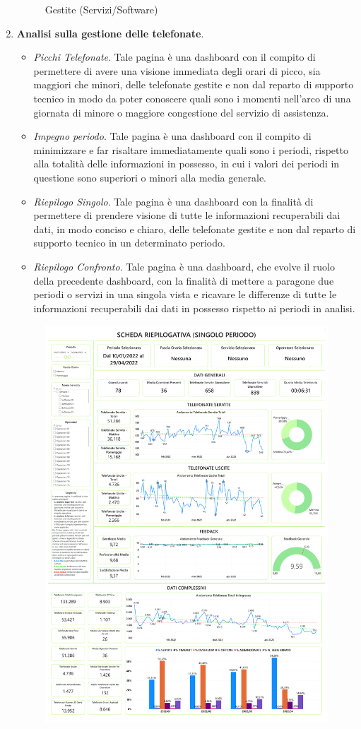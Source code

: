 \begin{enumerate}
\begin{figure}[H]
        \caption{Gestite (Servizi/Software)}
        \label{fig:BI Call Report-3}
        \end{figure}
    \item \textbf{Analisi sulla gestione delle telefonate}.
        \begin{itemize}
        \item \textit{Picchi Telefonate}. Tale pagina è una dashboard con il compito di permettere di avere una visione immediata degli orari di picco, sia maggiori che minori, delle telefonate gestite e non dal reparto di supporto tecnico in modo da poter conoscere quali sono i momenti nell'arco di una giornata di minore o maggiore congestione del servizio di assistenza.
        \item \textit{Impegno periodo}. Tale pagina è una dashboard con il compito di minimizzare e far risaltare immediatamente quali sono i periodi, rispetto alla totalità delle informazioni in possesso, in cui i valori dei periodi in questione sono superiori o minori alla media generale.
        \item \textit{Riepilogo Singolo}. Tale pagina è una dashboard con la finalità di permettere di prendere visione di tutte le informazioni recuperabili dai dati, in modo conciso e chiaro, delle telefonate gestite e non dal reparto di supporto tecnico in un determinato periodo.
        \item \textit{Riepilogo Confronto}. Tale pagina è una dashboard, che evolve il ruolo della precedente dashboard, con la finalità di mettere a paragone due periodi o servizi in una singola vista e ricavare le differenze di tutte le informazioni recuperabili dai dati in possesso rispetto ai periodi in analisi.
    \end{itemize}
        \begin{figure}[H]
        \centering
        \includegraphics[height=1\linewidth]{figure/capitolo_4/BI Call Report-4.pdf}

\end{figure}
\end{enumerate}
